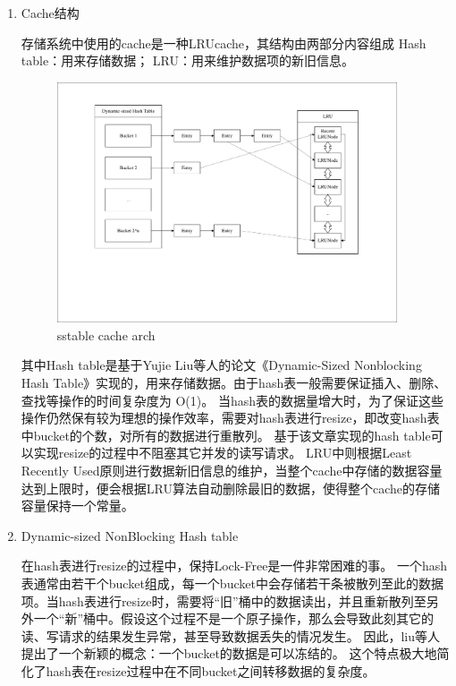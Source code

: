 		\begin{enumerate}
			\item Cache结构 
			
			存储系统中使用的cache是一种LRUcache，其结构由两部分内容组成
			Hash table：用来存储数据；
			LRU：用来维护数据项的新旧信息。

			\begin{figure}[H]
				\centering
				\includegraphics[width=0.95\textwidth]{pdf/cache_arch.pdf}
				\caption{sstable cache arch}
				\label{sstable_cache_arch}
			\end{figure}

			其中Hash table是基于Yujie Liu等人的论文《Dynamic-Sized Nonblocking Hash Table》实现的，用来存储数据。由于hash表一般需要保证插入、删除、查找等操作的时间复杂度为 O(1)。
当hash表的数据量增大时，为了保证这些操作仍然保有较为理想的操作效率，需要对hash表进行resize，即改变hash表中bucket的个数，对所有的数据进行重散列。
基于该文章实现的hash table可以实现resize的过程中不阻塞其它并发的读写请求。
LRU中则根据Least Recently Used原则进行数据新旧信息的维护，当整个cache中存储的数据容量达到上限时，便会根据LRU算法自动删除最旧的数据，使得整个cache的存储容量保持一个常量。


			\item Dynamic-sized NonBlocking Hash table
			
			在hash表进行resize的过程中，保持Lock-Free是一件非常困难的事。
一个hash表通常由若干个bucket组成，每一个bucket中会存储若干条被散列至此的数据项。当hash表进行resize时，需要将“旧”桶中的数据读出，并且重新散列至另外一个“新”桶中。假设这个过程不是一个原子操作，那么会导致此刻其它的读、写请求的结果发生异常，甚至导致数据丢失的情况发生。
因此，liu等人提出了一个新颖的概念：一个bucket的数据是可以冻结的。
这个特点极大地简化了hash表在resize过程中在不同bucket之间转移数据的复杂度。


\end{enumerate}
